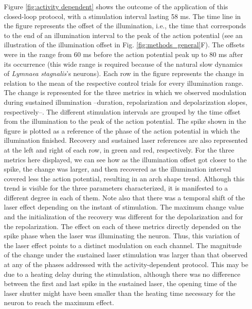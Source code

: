 Figure \ref{fig:activity dependent} shows the outcome of the application of this closed-loop protocol, with a stimulation interval lasting 58 ms. The time line in the figure represents the offset of the illumination, i.e., the time that corresponds to the end of an illumination interval to the peak of the action potential (see an illustration of the illumination offset in Fig. \ref{fig:methods_general}F). The offsets were in the range from 60 ms before the action potential peak up to 80 ms after its occurrence (this wide range is required because of the natural slow dynamics of \textit{Lymnaea stagnalis}'s neurons). Each row in the figure represents the change in relation to the mean of the respective control trials for every illumination range. The change is represented for the three metrics in which we observed modulation during sustained illumination --duration, repolarization and depolarization slopes, respectively--. The different stimulation intervals are grouped by the time offset from the illumination to the peak of the action potential. The spike shown in the figure is plotted as a reference of the phase of the action potential in which the illumination finished. Recovery and sustained laser references are also represented at the left and right of each row, in green and red, respectively. For the three metrics here displayed, we can see how as the illumination offset got closer to the spike, the change was larger, and then recovered as the illumination interval covered less the action potential, resulting in an arch shape trend. Although this trend is visible for the three parameters characterized, it is manifested to a different degree in each of them. Note also that there was a temporal shift of the laser effect depending on the instant of stimulation. The maximum change value and the initialization of the recovery was different for the depolarization and for the repolarization. The effect on each of these metrics directly depended on the spike phase when the laser was illuminating the neuron. Thus, this variation of the laser effect points to a distinct modulation on each channel. The magnitude of the change under the sustained laser stimulation was larger than that observed at any of the phases addressed with the activity-dependent protocol. This may be due to a heating delay during the stimulation, although there was no difference between the first and last spike in the sustained laser, the opening time of the laser shutter might have been smaller than the heating time necessary for the neuron to reach the maximum effect.

